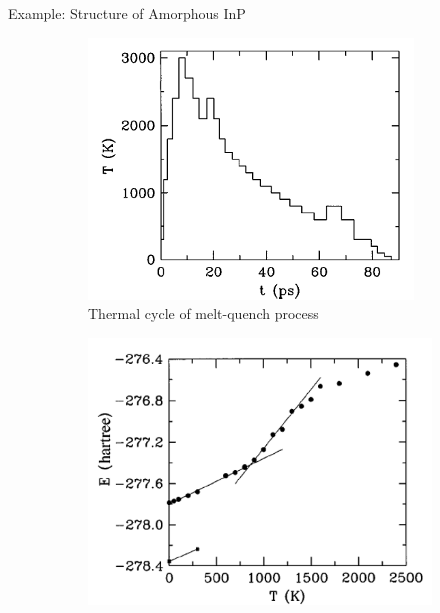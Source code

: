 \documentclass[aspectratio=169]{beamer}
\begin{document}
    \begin{frame}{Example: Structure of Amorphous InP}
        \begin{figure}
            \centering
            \begin{subfigure}{0.3\textwidth}
                \centering
                \includegraphics[width=\linewidth]{lectures/figures/13-InP_1.png}
                \caption{Thermal cycle of melt-quench process}
            \end{subfigure}
            \begin{subfigure}{0.3\textwidth}
                \centering
                \includegraphics[width=\linewidth]{lectures/figures/13-InP_2.png}

\end{subfigure}
\end{figure}
\end{frame}
\end{document}
